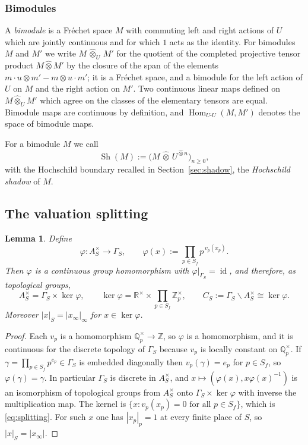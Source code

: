 \documentclass[11pt]{amsart}
\newtheorem{lemma}[theorem]{Lemma}
\theoremstyle{definition}
\theoremstyle{remark}
\newcommand{\R}{\mathbb R}
\newcommand{\Z}{\mathbb Z}
\newcommand{\Q}{\mathbb Q}
\newcommand{\Hom}{\operatorname{Hom}}
\newcommand{\id}{\operatorname{id}}
\newcommand{\Sh}{\operatorname{Sh}}
\begin{document}
\subsubsection*{Bimodules}
A \emph{bimodule} is a Fr\'echet space $M$ with commuting left and right
actions of $U$ which are jointly continuous and for which $1$ acts as the
identity.  For bimodules $M$ and $M'$ we write $M\,\widehat\otimes_U\,M'$ for
the quotient of the completed projective tensor product $M\widehat\otimes M'$
by the closure of the span of the elements $m\cdot u\otimes m'-m\otimes u\cdot m'$;
it is a Fr\'echet space, and a bimodule for the left action of $U$ on $M$ and
the right action on $M'$.  Two continuous linear maps defined on
$M\widehat\otimes_UM'$ which agree on the classes of the elementary tensors
are equal.  Bimodule maps are continuous by definition, and
$\Hom_{U\text{-}U}(M,M')$ denotes the space of bimodule maps.

For a bimodule $M$ we call
\begin{equation}\label{eq:shadow}
\Sh(M):=\bigl(M\,\widehat\otimes\,U^{\widehat\otimes n}\bigr)_{n\ge0},
\end{equation}
with the Hochschild boundary recalled in Section~\ref{sec:shadow}, the
\emph{Hochschild shadow} of $M$.

\subsection{The valuation splitting}

\begin{lemma}\label{thm:split}
Define
\begin{equation}\label{eq:phi}
\varphi:A_S^{\times}\longrightarrow\Gamma_S,\qquad
\varphi(x):=\prod_{p\in S_f}p^{\,v_p(x_p)} .
\end{equation}
Then $\varphi$ is a continuous group homomorphism with
$\varphi|_{\Gamma_S}=\id$, and therefore, as topological groups,
\begin{equation}\label{eq:splitting}
A_S^{\times}=\Gamma_S\times\ker\varphi,\qquad
\ker\varphi=\R^{\times}\times\prod_{p\in S_f}\Z_p^{\times},\qquad
C_S:=\Gamma_S\backslash A_S^{\times}\cong\ker\varphi .
\end{equation}
Moreover $|x|_S=|x_{\infty}|_{\infty}$ for $x\in\ker\varphi$.
\end{lemma}

\begin{proof}
Each $v_p$ is a homomorphism $\Q_p^{\times}\to\Z$, so $\varphi$ is a
homomorphism, and it is continuous for the discrete topology of $\Gamma_S$
because $v_p$ is locally constant on $\Q_p^{\times}$.  If
$\gamma=\prod_{p\in S_f}p^{e_p}\in\Gamma_S$ is embedded diagonally then
$v_p(\gamma)=e_p$ for $p\in S_f$, so $\varphi(\gamma)=\gamma$.  In particular
$\Gamma_S$ is discrete in $A_S^{\times}$, and
$x\mapsto(\varphi(x),x\varphi(x)^{-1})$ is an isomorphism of topological groups
from $A_S^{\times}$ onto $\Gamma_S\times\ker\varphi$ with inverse the
multiplication map.  The kernel is
$\{x: v_p(x_p)=0\text{ for all }p\in S_f\}$, which is \eqref{eq:splitting}.
For such $x$ one has $|x_p|_p=1$ at every finite place of $S$, so
$|x|_S=|x_{\infty}|$.
\end{proof}
\end{document}
